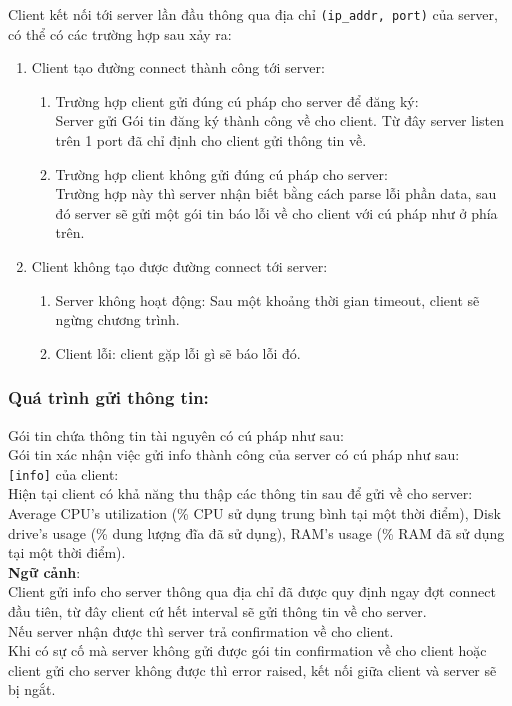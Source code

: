 \documentclass[a4paper,11pt]{extarticle}
\begin{document}
Client kết nối tới server lần đầu thông qua địa chỉ \texttt{(ip\_addr, port)} của server, có thể có các trường hợp sau xảy ra:
\begin{enumerate}[noitemsep]
    \item Client tạo đường connect thành công tới server:
    \begin{enumerate}[noitemsep]
        \item Trường hợp client gửi đúng cú pháp cho server để đăng ký: \\
        Server gửi Gói tin đăng ký thành công về cho client. Từ đây server listen trên 1 port đã chỉ định cho client gửi thông tin về. 
        \item Trường hợp client không gửi đúng cú pháp cho server: \\
        Trường hợp này thì server nhận biết bằng cách parse lỗi phần data, sau đó server sẽ gửi một gói tin báo lỗi về cho client với cú pháp như ở phía trên.
    \end{enumerate}
    \item Client không tạo được đường connect tới server:
    \begin{enumerate}[noitemsep]
        \item Server không hoạt động: Sau một khoảng thời gian timeout, client sẽ ngừng chương trình.
        \item Client lỗi: client gặp lỗi gì sẽ báo lỗi đó.
    \end{enumerate}
\end{enumerate}

\subsubsection{Quá trình gửi thông tin:}
Gói tin chứa thông tin tài nguyên có cú pháp như sau:  \\
Gói tin xác nhận việc gửi info thành công của server có cú pháp như sau:   \\
\texttt{[info]} của client: \\
Hiện tại client có khả năng thu thập các thông tin sau để gửi về cho server: Average CPU's utilization (\% CPU sử dụng trung bình tại một thời điểm), Disk drive's usage (\% dung lượng đĩa đã sử dụng), RAM's usage (\% RAM đã sử dụng tại một thời điểm).  \\
\textbf{Ngữ cảnh}: \\
Client gửi info cho server thông qua địa chỉ đã được quy định ngay đợt connect đầu tiên, từ đây client cứ hết interval sẽ gửi thông tin về cho server. \\
Nếu server nhận được thì server trả confirmation về cho client. \\ 
Khi có sự cố mà server không gửi được gói tin confirmation về cho client hoặc client gửi cho server không được thì error raised, kết nối giữa client và server sẽ bị ngắt.
\end{document}
